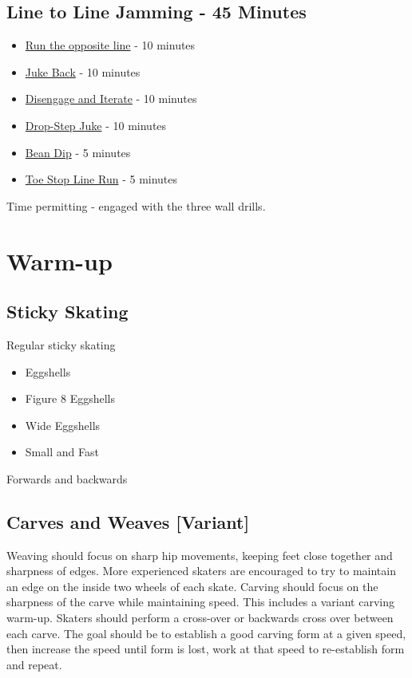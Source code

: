 \documentclass{journal}
\begin{document}
\subsection*{Line to Line Jamming - 45 Minutes} 
\begin{itemize}
    \item \hyperref[drill:line_to_line_jamming:cutting]{Run the opposite line} - 10 minutes
    \item \hyperref[drill:line_to_line_jamming:juke_approach]{Juke Back} - 10 minutes
    \item \hyperref[drill:line_to_line_jamming:iterate]{Disengage and Iterate} - 10 minutes
    \item \hyperref[drill:line_to_line_jamming:Engage Juke]{Drop-Step Juke} - 10 minutes
    \item \hyperref[drill:line_to_line_jamming:bean_dip]{Bean Dip} - 5 minutes
    \item \hyperref[drill:line_to_line_jamming:toe_stop_line_run]{Toe Stop Line Run} - 5 minutes
\end{itemize}

Time permitting - engaged with the three wall drills.

\pagebreak
\section*{Warm-up}
\label{sec:warmup}

\subsection*{Sticky Skating}
\label{drill:sticky:eggshells}

Regular sticky skating
\begin{itemize}
\item Eggshells 
\item Figure 8 Eggshells
\item Wide Eggshells
\item Small and Fast
\end{itemize}
Forwards and backwards

\subsection*{Carves and Weaves [Variant]}
\label{drill:sticky:carves_and_weaves}
Weaving should focus on sharp hip movements, keeping feet close together and sharpness of edges. More experienced skaters are encouraged to try to maintain an edge on the inside two wheels of each skate.     
Carving should focus on the sharpness of the carve while maintaining speed.
This includes a variant carving warm-up. 
Skaters should perform a cross-over or backwards cross over between each carve.
The goal should be to establish a good carving form at a given speed, then increase the speed until form is lost, work at that speed to re-establish form and repeat.
\end{document}
